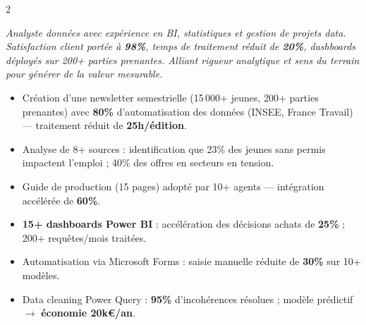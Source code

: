 \documentclass[9pt,a4paper,ragged2e,withhyper]{altacv}
\begin{document}


\makecvheader
\vspace{2pt}


\begin{paracol}{2}


{\small\color{emphasis}\itshape
Analyste données avec expérience en BI, statistiques et gestion de projets data. Satisfaction client portée à \textbf{98\%}, temps de traitement réduit de \textbf{20\%}, dashboards déployés sur 200+ parties prenantes. Alliant rigueur analytique et sens du terrain pour générer de la valeur mesurable.}

\vspace{4pt}


\vspace{-4pt}
\begin{itemize}
  \item Création d'une newsletter semestrielle (15\,000+ jeunes, 200+ parties prenantes) avec \textbf{80\%} d'automatisation des données (INSEE, France Travail) --- traitement réduit de \textbf{25h/édition}.
  \item Analyse de 8+ sources : identification que 23\% des jeunes sans permis impactent l'emploi ; 40\% des offres en secteurs en tension.
  \item Guide de production (15 pages) adopté par 10+ agents --- intégration accélérée de \textbf{60\%}.
\end{itemize}

\vspace{-2pt}\divider\vspace{-2pt}

\vspace{-4pt}
\begin{itemize}
  \item \textbf{15+ dashboards Power BI} : accélération des décisions achats de \textbf{25\%} ; 200+ requêtes/mois traitées.
  \item Automatisation via Microsoft Forms : saisie manuelle réduite de \textbf{30\%} sur 10+ modèles.
  \item Data cleaning Power Query : \textbf{95\%} d'incohérences résolues ; modèle prédictif $\rightarrow$ \textbf{économie 20k€/an}.
\end{itemize}


\end{paracol}
\end{document}
